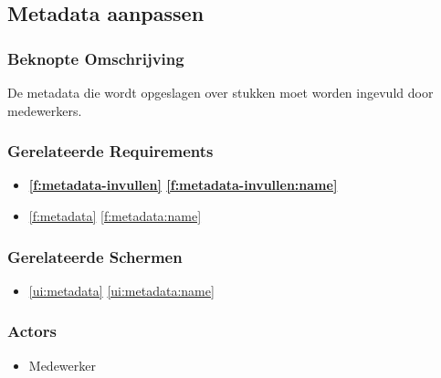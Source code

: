 \documentclass[a4paper,titlepage]{report}
\makeatletter
\def\namedlabel#1#2{
  \label{#1}
  \begingroup
   \def\@currentlabel{#2}%
   \label{#1:name}\endgroup
}
\def\namedref#1{\ref{#1} \ref{#1:name}}
\makeatother
\begin{document}
        \pagebreak
    \subsection{Metadata aanpassen}
    \namedlabel{u:metadata-aanpassen}{Metadata aanpassen}
      \subsubsection{Beknopte Omschrijving}
        De metadata die wordt opgeslagen over stukken moet worden ingevuld
        door medewerkers.
      \subsubsection{Gerelateerde Requirements}
        \begin{itemize}
          \item \textbf{\namedref{f:metadata-invullen}}
          \item \namedref{f:metadata}
        \end{itemize}
      \subsubsection{Gerelateerde Schermen}
        \begin{itemize}
          \item \namedref{ui:metadata}
        \end{itemize}
      \subsubsection{Actors}
        \begin{itemize}
          \item Medewerker
        \end{itemize}
\end{document}
